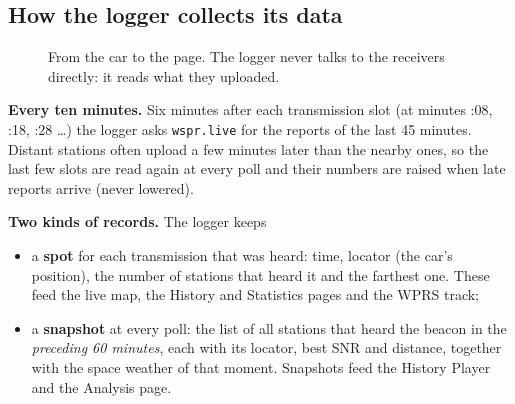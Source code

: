 \documentclass[10pt,a4paper]{article}
\newcommand{\lead}[1]{\textbf{#1}\enspace}           %
\begin{document}
\subsection{How the logger collects its data}
\begin{figure}[H]\centering
{}
\caption{From the car to the page. The logger never talks to the receivers directly: it reads what they uploaded.}
\end{figure}

\lead{Every ten minutes.} Six minutes after each transmission slot (at minutes :08, :18, :28 \dots) the logger asks \texttt{wspr.live} for the reports of the last 45 minutes. Distant stations often upload a few minutes later than the nearby ones, so the last few slots are read again at every poll and their numbers are raised when late reports arrive (never lowered).

\lead{Two kinds of records.} The logger keeps
\begin{itemize}[leftmargin=1.2em]
\item a \textbf{spot} for each transmission that was heard: time, locator (the car's position), the number of stations that heard it and the farthest one. These feed the live map, the History and Statistics pages and the WPRS track;
\item a \textbf{snapshot} at every poll: the list of all stations that heard the beacon in the \emph{preceding 60 minutes}, each with its locator, best SNR and distance, together with the space weather of that moment. Snapshots feed the History Player and the Analysis page.
\end{itemize}
\end{document}
